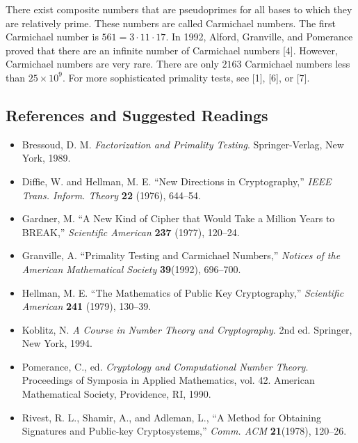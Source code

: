 {\begin{enumerate}
 
There exist composite numbers that are pseudoprimes for all bases to
which they are relatively prime.  These numbers are called {\bfi
Carmichael numbers}. The first Carmichael
number is $561 = 3 \cdot 11 \cdot 17$.  In 1992, Alford, Granville, and
Pomerance proved that there are an infinite number of Carmichael
numbers [4].  However, Carmichael numbers are very rare.  There are
only $2163$ Carmichael numbers less than $25 \times 10^9$. For more
sophisticated primality tests, see [1], [6], or [7].  
 
 
\end{enumerate}
}
 
 
\subsection*{References and Suggested Readings}
 
{\small
\begin{itemize}
 
\item[{\bf [1]}]
Bressoud, D. M. {\it Factorization and Primality Testing}.
Springer-Verlag, New York, 1989. 
 
\item[{\bf [2]}]
Diffie, W. and Hellman, M. E. ``New Directions in
Cryptography,'' {\it IEEE Trans. Inform. Theory} {\bf
22} (1976), 644--54.
 
\item[{\bf [3]}]
Gardner, M. ``A New Kind of Cipher that Would Take a Million
Years to BREAK,'' {\it Scientific American} {\bf
237} (1977), 120--24.
 
\item[{\bf [4]}]%
Granville, A. ``Primality Testing and Carmichael Numbers,'' {\it
Notices of the American Mathematical Society} {\bf 39}(1992),
696--700. 
 
\item[{\bf [5]}]
Hellman, M. E. ``The Mathematics of Public Key
Cryptography,''  {\it Scientific American} {\bf 241}
(1979), 130--39.
 

\item[{\bf [6]}] %
Koblitz, N. {\it A Course in Number Theory and Cryptography}. 2nd ed.
Springer, New York, 1994.  
 
 
\item[{\bf [7]}]
Pomerance, C., ed. {\it Cryptology and Computational Number
Theory}. Proceedings of Symposia in Applied Mathematics,
vol. 42. American Mathematical Society, Providence, RI,
1990.
 
\item[{\bf [8]}]
Rivest, R. L., Shamir, A., and Adleman, L., ``A Method for
Obtaining Signatures and Public-key Cryptosystems,'' {\it
Comm. ACM} {\bf 21}(1978), 120--26.
 
\end{itemize}
}
 
\sagesection

 
